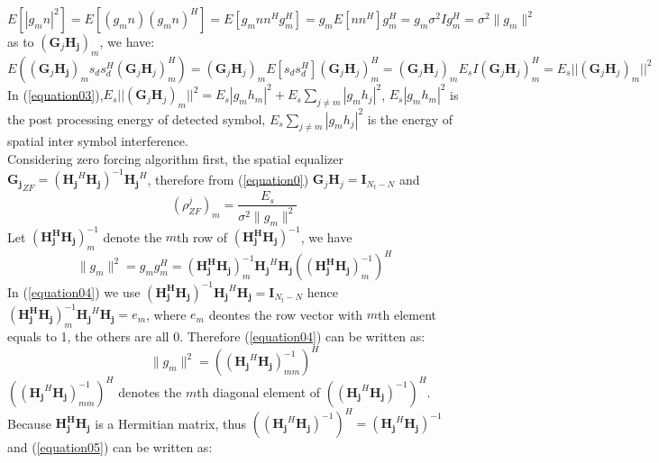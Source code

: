 \documentclass[12pt,a4paper,final]{article}
\begin{document}
\begin{spacing}{2.5}
\begin{equation}
E[|g_{m}n|^{2}]= E[(g_{m}n)(g_{m}n)^{H}]=E[g_{m}nn^{H}g_{m}^{H}]=g_{m}E[nn^{H}]g_{m}^{H}=g_{m}\sigma^{2}Ig_{m}^{H}
=\sigma^{2}\parallel g_{m} \parallel^{2}
\end{equation}
as to $(\mathbf{G}_{j}\mathbf{H_{j}})_{m}$, we have:
\begin{equation}
E((\mathbf{G}_{j}\mathbf{H_{j}})_{m}s_{d}s_{d}^{H}(\mathbf{G}_{j}\mathbf{H}_{j})_{m}^{H})=(\mathbf{G}_{j}\mathbf{H}_{j})_{m}E[s_{d}s_{d}^{H}](\mathbf{G}_{j}\mathbf{H}_{j})_{m}^{H}=(\mathbf{G}_{j}\mathbf{H}_{j})_{m}E_{s}I(\mathbf{G}_{j}\mathbf{H}_{j})_{m}^{H} =E_{s}||(\mathbf{G}_{j}\mathbf{H}_{j})_{m}||^{2}\label{equation03}
\end{equation}
In (\ref{equation03}),$E_{s}||(\mathbf{G}_{j}\mathbf{H}_{j})_{m}||^{2}=E_{s}|g_{m}h_{m}|^{2}+E_{s}\sum_{j\neq m}|g_{m}h_{j}|^{2}$, $E_{s}|g_{m}h_{m}|^{2}$ is the post processing energy of detected symbol, $E_{s}\sum_{j\neq m}|g_{m}h_{j}|^{2}$ is the energy of spatial inter symbol interference. \\
Considering zero forcing algorithm first, the spatial equalizer $\mathbf{G_{j}}_{ZF}=(\mathbf{H_{j}}^{H}\mathbf{H_{j}})^{-1}\mathbf{H_{j}}^{H}$, therefore from (\ref{equation0}) $\mathbf{G}_{j}\mathbf{H}_{j}=\mathbf{I}_{N_t-N}$ and
\begin{equation}
(\rho_{ZF}^{j})_{m}=\frac{E_{s}}{\sigma^{2}\parallel g_{m} \parallel^{2}}\label{equation05}
\end{equation}
Let $(\mathbf{H_{j}^{H}H_{j}})^{-1}_{m}$ denote the $m$th row of $(\mathbf{H_{j}^{H}H_{j}})^{-1}$, we have
\begin{equation}
\parallel g_{m} \parallel^{2}=g_{m}g_{m}^{H}=(\mathbf{H_{j}^{H}H_{j}})^{-1}_{m}\mathbf{H_{j}}^{H}\mathbf{H_{j}}((\mathbf{H_{j}^{H}H_{j}})^{-1}
_{m})^{H}\label{equation04}
\end{equation}
In (\ref{equation04}) we use $(\mathbf{H_{j}^{H}H_{j}})^{-1}\mathbf{H_{j}}^{H}\mathbf{H_{j}}=\mathbf{I}_{N_t-N}$ hence $(\mathbf{H_{j}^{H}H_{j}})^{-1}_{m}\mathbf{H_{j}}^{H}\mathbf{H_{j}}=e_{m}$, where $e_{m}$ deontes the row vector with $m$th element equals to 1, the others are all 0. Therefore (\ref{equation04}) can be written as:
\begin{equation}
\parallel g_{m} \parallel^{2}=((\mathbf{H_{j}}^{H}\mathbf{H_{j}})^{-1}_{mm})^{H}
\end{equation}
$((\mathbf{H_{j}}^{H}\mathbf{H_{j}})^{-1}_{mm})^{H}$ denotes the $m$th diagonal element of $((\mathbf{H_{j}}^{H}\mathbf{H_{j}})^{-1})^{H}$. Because $\mathbf{H_{j}^{H}}\mathbf{H_{j}}$ is a Hermitian matrix, thus $((\mathbf{H_{j}}^{H}\mathbf{H_{j}})^{-1})^{H}=(\mathbf{H_{j}}^{H}\mathbf{H_{j}})^{-1}$\cite{7} and (\ref{equation05}) can be written as:

\end{spacing}
\end{document}
